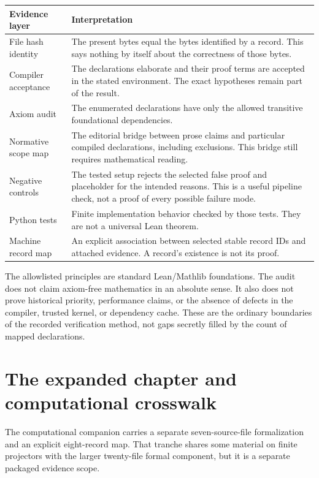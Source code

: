 \documentclass[11pt,a4paper]{article}
\begin{document}
\begin{longtable}{p{}p{}}
\toprule Evidence layer & Interpretation \\\midrule\endhead
File hash identity & The present bytes equal the bytes identified by a record. This says nothing by itself about the correctness of those bytes. \\
Compiler acceptance & The declarations elaborate and their proof terms are accepted in the stated environment. The exact hypotheses remain part of the result. \\
Axiom audit & The enumerated declarations have only the allowed transitive foundational dependencies. \\
Normative scope map & The editorial bridge between prose claims and particular compiled declarations, including exclusions. This bridge still requires mathematical reading. \\
Negative controls & The tested setup rejects the selected false proof and placeholder for the intended reasons. This is a useful pipeline check, not a proof of every possible failure mode. \\
Python tests & Finite implementation behavior checked by those tests. They are not a universal Lean theorem. \\
Machine record map & An explicit association between selected stable record IDs and attached evidence. A record's existence is not its proof. \\
\bottomrule
\end{longtable}

The allowlisted principles are standard Lean/Mathlib foundations. The audit does not claim axiom-free mathematics in an absolute sense. It also does not prove historical priority, performance claims, or the absence of defects in the compiler, trusted kernel, or dependency cache. These are the ordinary boundaries of the recorded verification method, not gaps secretly filled by the count of mapped declarations.

\section{The expanded chapter and computational crosswalk}

The computational companion carries a separate seven-source-file formalization and an explicit eight-record map. That tranche shares some material on finite projectors with the larger twenty-file formal component, but it is a separate packaged evidence scope.
\end{document}

